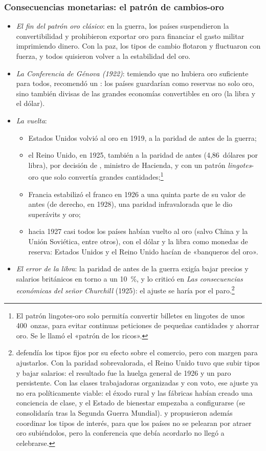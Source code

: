 \documentclass[11pt]{article}
\begin{document}
\subsubsection{Consecuencias monetarias: el patrón de cambios-oro}

\begin{itemize}
\item \emph{El fin del patrón oro clásico}: en la guerra, los países suspendieron la convertibilidad y prohibieron exportar oro para financiar el gasto militar imprimiendo dinero. Con la paz, los tipos de cambio flotaron y fluctuaron con fuerza, y todos quisieron volver a la estabilidad del oro.
\item \emph{La Conferencia de Génova (1922)}: temiendo que no hubiera oro suficiente para todos, recomendó un : los países guardarían como reservas no solo oro, sino también divisas de las grandes economías convertibles en oro (la libra y el dólar).
\item \emph{La vuelta}:
  \begin{itemize}
  \item Estados Unidos volvió al oro en 1919, a la paridad de antes de la guerra;
  \item el Reino Unido, en 1925, también a la paridad de antes (4,86~dólares por libra), por decisión de , ministro de Hacienda, y con un patrón \emph{lingotes}-oro que solo convertía grandes cantidades;\footnote{El patrón lingotes-oro solo permitía convertir billetes en lingotes de unos 400~onzas, para evitar continuas peticiones de pequeñas cantidades y ahorrar oro. Se le llamó el «patrón de los ricos».}
  \item Francia estabilizó el franco en 1926 a una quinta parte de su valor de antes (de derecho, en 1928), una paridad infravalorada que le dio superávits y oro;
  \item hacia 1927 casi todos los países habían vuelto al oro (salvo China y la Unión Soviética, entre otros), con el dólar y la libra como monedas de reserva: Estados Unidos y el Reino Unido hacían de «banqueros del oro».
  \end{itemize}
\item \emph{El error de la libra}: la paridad de antes de la guerra exigía bajar precios y salarios británicos en torno a un 10~\%, y  lo criticó en \emph{Las consecuencias económicas del señor Churchill} (1925): el ajuste se haría por el paro\nocite{Keynes1925Economic}.\footnote{ defendía los tipos fijos por su efecto sobre el comercio, pero con margen para ajustarlos. Con la paridad sobrevalorada, el Reino Unido tuvo que subir tipos y bajar salarios: el resultado fue la huelga general de 1926 y un paro persistente. Con las clases trabajadoras organizadas y con voto, ese ajuste ya no era políticamente viable: el éxodo rural y las fábricas habían creado una conciencia de clase, y el Estado de bienestar empezaba a configurarse (se consolidaría tras la Segunda Guerra Mundial).  y  propusieron además coordinar los tipos de interés, para que los países no se pelearan por atraer oro subiéndolos, pero la conferencia que debía acordarlo no llegó a celebrarse.}

\end{itemize}
\end{document}
